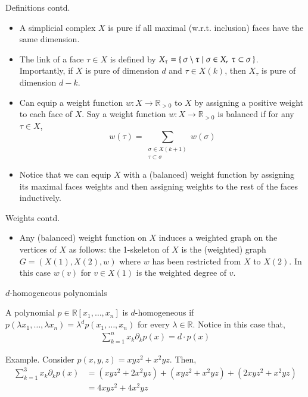 \documentclass[10pt]{beamer}
\newcommand{\R}{\mathbb{R}}
\begin{document}
\begin{frame}{Definitions contd.}
    \small\begin{itemize}
        \item A simplicial complex $X$ is pure if all maximal (w.r.t. inclusion) faces have the same dimension. 
        \item The link of a face $\tau \in X$ is defined by $X_\tau = \Set{\sigma \setminus \tau \mid \sigma \in X, \; \tau \subset \sigma}$. Importantly, if $X$ is pure of dimension $d$ and $\tau \in X(k)$, then $X_\tau$ is pure of dimension $d-k$.
        \item Can equip a weight function $w: X \to \R_{> 0}$  to $X$ by assigning a positive weight to each face of $X$. Say a weight function $w: X \to \R_{> 0}$ is balanced if for any $\tau \in X$, $$w(\tau) = \sum_{\substack{\sigma \in X(k+1) \\ \tau \subset \sigma}} w(\sigma)$$
        \item Notice that we can equip $X$ with a (balanced) weight function by assigning its maximal faces weights and then assigning weights to the rest of the faces inductively.
    \end{itemize}
\end{frame}

\begin{frame}{Weights contd.}
\begin{itemize}
    \item Any (balanced) weight function on $X$ induces a weighted graph on the vertices of $X$ as follows: the 1-skeleton of $X$ is the (weighted) graph $G = (X(1), X(2), w)$ where $w$ has been restricted from $X$ to $X(2)$. In this case $w(v)$ for $v \in X(1)$ is the weighted degree of $v$.
\end{itemize}
\end{frame}

\begin{frame}{$d$-homogeneous polynomials}

    A polynomial $p \in \R[x_1, \ldots, x_n]$ is $d$-homogeneous if $p(\lambda x_1, \ldots, \lambda x_n) = \lambda^dp(x_1, \ldots, x_n)$ for every $\lambda \in \R$. Notice in this case that,
    \begin{align*}
        \sum_{k=1}^n x_k \partial_k p(x) = d \cdot p(x)
    \end{align*}

    Example. Consider $p(x, y, z) = xyz^2 + x^2yz$. Then,
    \begin{align*}
        \sum_{k=1}^3 x_k \partial_k p(x) &= (xyz^2 + 2x^2yz) + (xyz^2 + x^2yz) + (2xyz^2 + x^2yz) \\ &= 4xyz^2 + 4x^2yz
    \end{align*}
\end{frame}
\end{document}
